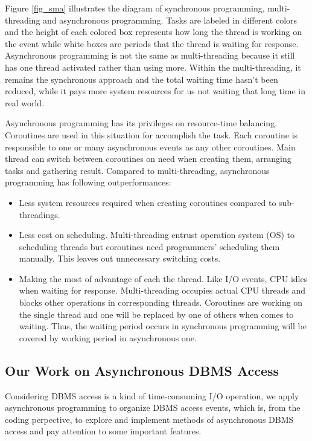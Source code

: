 \documentclass[onecolumn, conference, 12pt]{IEEEtran}
\begin{document}
	Figure \ref{fig_sma} illustrates the diagram of synchronous programming, multi-threading and asynchronous programming. Tasks are labeled in different colors and the height of each colored box represents how long the thread is working on the event while white boxes are periods that the thread is waiting for response. Asynchronous programming is not the same as multi-threading because it still has one thread activated rather than using more. Within the multi-threading, it remains the synchronous approach and the total waiting time hasn't been reduced, while it pays more system resources for us not waiting that long time in real world. 

	Asynchronous programming has its privileges on resource-time balancing. Coroutines are used in this situation for accomplish the task. Each coroutine is responsible to one or many asynchronous events as any other coroutines. Main thread can switch between coroutines on need when creating them, arranging tasks and gathering result. Compared to multi-threading, asynchronous programming has following outperformances:
	\begin{itemize}[]
	\item Less system resources required when creating coroutines compared to sub-threadings. 
	\item Less cost on scheduling. Multi-threading entrust operation system (OS) to scheduling threads but coroutines need programmers' scheduling them manually. This leaves out unnecessary switching costs.
	\item Making the most of advantage of each the thread. Like I/O events, CPU idles when waiting for response. Multi-threading occupies actual CPU threads and blocks other operations in corresponding threads. Coroutines are working on the single thread and one will be replaced by one of others when comes to waiting. Thus, the waiting period occurs in synchronous programming will be covered by working period in asynchronous one.
	\end{itemize}

	\subsection{Our Work on Asynchronous DBMS Access}
	Considering DBMS access is a kind of time-consuming I/O operation, we apply asynchronous programming to organize DBMS access events, which is, from the coding perpective, to explore and implement methods of asynchronous DBMS access and pay attention to some important features. 
\end{document}

